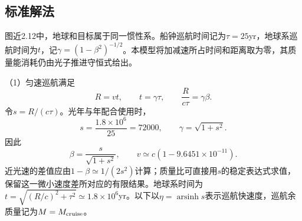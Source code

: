 \documentclass[UTF8,fontset=fandol,a4paper,11pt]{ctexart}
\begin{document}


\subsection*{标准解法}


图近2.12中，地球和目标属于同一惯性系。船钟巡航时间记为$\tau=25$yr，地球系巡航时间为$t$，记$\gamma=(1-\beta^2)^{-1/2}$。本模型将加减速所占时间和距离取为零，其质量能消耗仍由光子推进守恒式给出。

（1）匀速巡航满足
\[
R=vt,\qquad t=\gamma\tau,
\qquad \frac{R}{c\tau}=\gamma\beta.
\]
令$s=R/(c\tau)$。光年与年配合使用时，
\[
s=\frac{1.8\times10^6}{25}=72000,\qquad
\gamma=\sqrt{1+s^2}.
\]
因此
\[
\boxed{\beta=\frac{s}{\sqrt{1+s^2}}},
\qquad
\boxed{v\simeq c(1-9.6451\times10^{-11})}.
\]
近光速的差值应由$1-\beta\simeq1/(2s^2)$计算；质量比可直接用$s$的稳定表达式求值，保留这一微小速度差所对应的有限结果。地球系时间为$t=\sqrt{(R/c)^2+\tau^2}\simeq1.8\times10^6$yr。以下以$\eta=\operatorname{arsinh}s$表示巡航快速度，巡航余质量记为$M=M_{\rm cruise}$。
\end{document}
